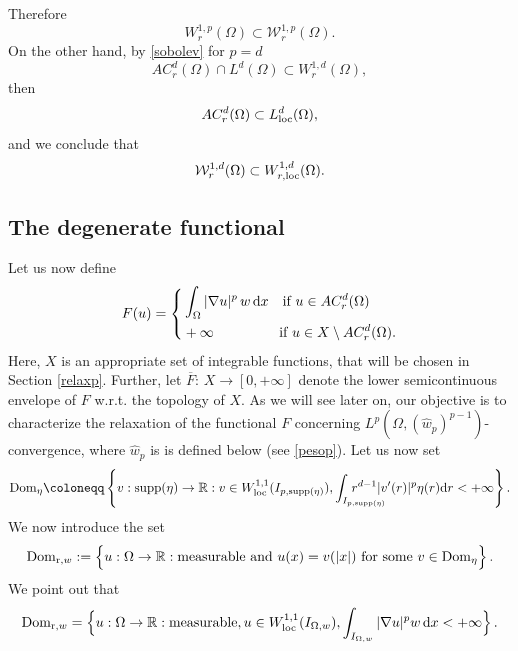 \documentclass[11pt,leqno]{amsart}
\theoremstyle{remark}
\theoremstyle{definition}
\theoremstyle{definition}
\newcommand{\supp}{\mathrm{supp}}
\newcommand{\bbR}{{\mathbb{R}}}
\newcommand{\R}{\bbR}
\def\de{{\rm d}}
\begin{document}
Therefore
\begin{equation*}\label{ifp>d12}
W^{1,p}_r(\Omega)\subset {\mathcal{W}}^{1,p}_r(\Omega).
\end{equation*}
On the other hand, by \eqref{sobolev} for $p=d$
\begin{equation*}\label{sobolev1}
AC^{d}_r(\Omega)\cap L^d(\Omega)\subset W^{1,d}_r(\Omega),
\end{equation*}
then
$$
AC^{d}_r(\Omega)\subset L^d_{\rm{loc}}(\Omega),
$$
and we conclude that
\begin{equation*}\label{ifp>d123}
{\mathcal{W}}^{1,d}_r(\Omega)\subset W^{1,d}_{r,{\rm loc}}(\Omega).
\end{equation*}

\subsection{The degenerate functional}
Let us now define
\begin{equation*}
F(u)=\left\{
\begin{aligned}
& \int_{\Omega} |\nabla u|^p\,w\,\de x\text{   \ \ if } u\in AC_{r}^{d}(\Omega)\\
& +\infty \ \ \ \ \ \ \ \ \ \ \ \text{   \ \ if } u\in X\setminus AC_{r}^{d}(\Omega).
\end{aligned}
\right.
\end{equation*}
Here, $X$ is an appropriate set of integrable functions, that will be chosen in Section \ref{relaxp}. Further, let $\overline F:\,X\to [0,+\infty]$ denote the lower semicontinuous envelope of $F$ w.r.t. the topology of  $X$. As we will see later on, our objective is to characterize the relaxation of the functional  $F$ concerning $L^{p}(\Omega,(\hat{w}_{p})^{p-1})$-convergence, where $\hat{w}_{p}$ is is defined below (see \eqref{pesop}). Let us now set 
\begin{align*}
\label{unidim}
{\rm{Dom}}_{\eta}\coloneqq \left\{v: {\supp(\eta)}\rightarrow \R: v\in W_{{\rm loc}}^{1,1}(I_{p,\supp(\eta)}), \displaystyle\int_{I_{p,\supp(\eta)}}\hskip -1cmr^{d-1}\vert v'(r)\vert^{p}\eta(r)\de r<+\infty\right\}.
\end{align*}
We now introduce the set
\begin{equation}\label{domw}
{\rm{Dom}}_{{\mathrm r},w}:=\Big\{u:\Omega\to\R: \text{measurable and $u(x)=v(\vert x\vert)$ for some $v\in {\rm{Dom}}_{\eta}$}\Big\}\,.
\end{equation}
We point out that
\begin{equation*}\label{domw1}
{\rm{Dom}}_{{\mathrm r},w}=\Big\{u:\Omega\to\R: \text{measurable}, u\in W^{1,1}_{\rm{loc}}(I_{\Omega,w}), \int_{I_{\Omega,w}}|\nabla u|^p w\,\de x<+\infty
\Big\}\,.
\end{equation*}
\end{document}
